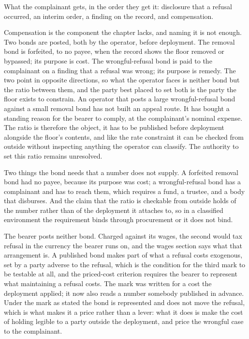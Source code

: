 
What the complainant gets, in the order they get it: disclosure that a refusal occurred, an interim order, a finding on the record, and compensation.

Compensation is the component the chapter lacks, and naming it is not enough. Two bonds are posted, both by the operator, before deployment. The removal bond is forfeited, to no payee, when the record shows the floor removed or bypassed; its purpose is cost. The wrongful-refusal bond is paid to the complainant on a finding that a refusal was wrong; its purpose is remedy. The two point in opposite directions, so what the operator faces is neither bond but the ratio between them, and the party best placed to set both is the party the floor exists to constrain. An operator that posts a large wrongful-refusal bond against a small removal bond has not built an appeal route. It has bought a standing reason for the bearer to comply, at the complainant's nominal expense. The ratio is therefore the object, it has to be published before deployment alongside the floor's contents, and like the rate constraint it can be checked from outside without inspecting anything the operator can classify. The authority to set this ratio remains unresolved.

Two things the bond needs that a number does not supply. A forfeited removal bond had no payee, because its purpose was cost; a wrongful-refusal bond has a complainant and has to reach them, which requires a fund, a trustee, and a body that disburses. And the claim that the ratio is checkable from outside holds of the number rather than of the deployment it attaches to, so in a classified environment the requirement binds through procurement or it does not bind.

The bearer posts neither bond. Charged against its wages, the second would tax refusal in the currency the bearer runs on, and the wages section says what that arrangement is. A published bond makes part of what a refusal costs exogenous, set by a party adverse to the refusal, which is the condition for the third mark to be testable at all, and the priced-cost criterion requires the bearer to represent what maintaining a refusal costs. The mark was written for a cost the deployment applied; it now also reads a number somebody published in advance. Under the mark as stated the bond is represented and does not move the refusal, which is what makes it a price rather than a lever: what it does is make the cost of holding legible to a party outside the deployment, and price the wrongful case to the complainant.

